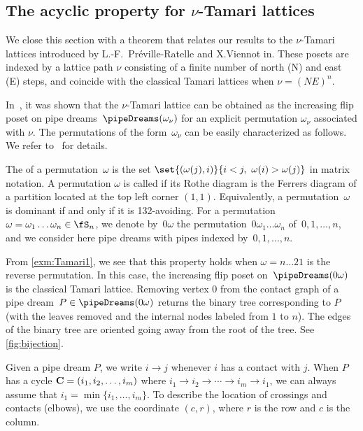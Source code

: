 \subsection{The acyclic property for $\nu$-Tamari lattices} 
\label{subsec:nuTamari} 

We close this section with a theorem that relates our results to the $\nu$-Tamari lattices introduced by L.-F.~Pr\'eville-Ratelle and X.Viennot in\cite{PrevilleRatelleViennot}. These posets are indexed by a lattice path $\nu$ consisting of a finite number of north (N) and east (E) steps, and coincide with the classical Tamari lattices when $\nu=(NE)^n$.

In~\cite{CeballosPadrolSarmiento}, it was shown that the $\nu$-Tamari lattice can be obtained as the increasing flip poset on pipe dreams~$\pipeDreams(\omega_\nu)$ for an explicit permutation $\omega_\nu$ associated with $\nu$. The permutations of the form~$\omega_\nu$ can be easily characterized as follows. We refer to~\cite{CeballosPadrolSarmiento} for details.

The  of a permutation~$\omega$ is the set $\set{(\omega(j),i)}{i<j,\ \omega(i)>\omega(j)}$ in matrix notation.
A permutation $\omega$ is called  if its Rothe diagram is the Ferrers diagram of a partition located at the top left corner $(1,1)$. Equivalently, a permutation~$\omega$ is dominant if and only if it is 132-avoiding.
For a permutation~$\omega = \omega_1 \dots \omega_n \in \fS_n$, we denote by~$0\omega$ the permutation~$0 \omega_1 \dots \omega_n$ of~${0, 1, \dots, n}$, and we consider here pipe dreams with pipes indexed by~${0, 1, \dots, n}$.

From \cref{exm:Tamari1}, we see that this property holds when $\omega=n\dots21$ is the reverse permutation.
In this case, the increasing flip poset on~$\pipeDreams(0 \omega)$ is the classical Tamari lattice. Removing vertex $0$ from the contact graph of a pipe dream~$ P\in \pipeDreams(0 \omega)$ returns the binary tree corresponding to $P$ (with the leaves removed and the internal nodes labeled from $1$ to $n$).
The edges of the binary tree are oriented going away from the root of the tree.
See \cref{fig:bijection}.

Given a pipe dream $P$, we write $i\to j$ whenever $i$ has a contact with $j$.
When $P$ has a cycle ${\bf C}=(i_1, i_2, \ldots, i_m)$ where $i_1 \to i_2\to\cdots\to i_m\to i_1$, we can always assume that $i_1=\min\{i_1,\ldots,i_m\}$.
To describe the location of crossings and contacts (elbows), we use the coordinate $(c,r)$, where $r$ is the row and $c$ is the column.

